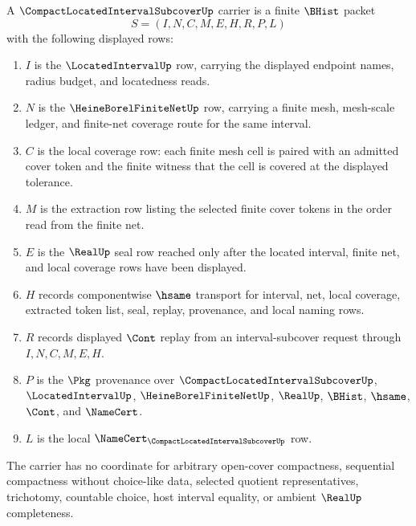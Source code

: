 \begin{definition}
\label{def:compact-located-interval-subcover-carrier}
A $\CompactLocatedIntervalSubcoverUp$ carrier is a finite $\BHist$ packet
$$
S=(I,N,C,M,E,H,R,P,L)
$$
with the following displayed rows:
\begin{enumerate}
\item $I$ is the $\LocatedIntervalUp$ row, carrying the displayed endpoint names, radius budget, and locatedness reads.
\item $N$ is the $\HeineBorelFiniteNetUp$ row, carrying a finite mesh, mesh-scale ledger, and finite-net coverage route for the same interval.
\item $C$ is the local coverage row: each finite mesh cell is paired with an admitted cover token and the finite witness that the cell is covered at the displayed tolerance.
\item $M$ is the extraction row listing the selected finite cover tokens in the order read from the finite net.
\item $E$ is the $\RealUp$ seal row reached only after the located interval, finite net, and local coverage rows have been displayed.
\item $H$ records componentwise $\hsame$ transport for interval, net, local coverage, extracted token list, seal, replay, provenance, and local naming rows.
\item $R$ records displayed $\Cont$ replay from an interval-subcover request through $I,N,C,M,E,H$.
\item $P$ is the $\Pkg$ provenance over $\CompactLocatedIntervalSubcoverUp$, $\LocatedIntervalUp$, $\HeineBorelFiniteNetUp$, $\RealUp$, $\BHist$, $\hsame$, $\Cont$, and $\NameCert$.
\item $L$ is the local $\NameCert_{\CompactLocatedIntervalSubcoverUp}$ row.
\end{enumerate}
The carrier has no coordinate for arbitrary open-cover compactness, sequential compactness without choice-like data, selected quotient representatives, trichotomy, countable choice, host interval equality, or ambient $\RealUp$ completeness.
\end{definition}

